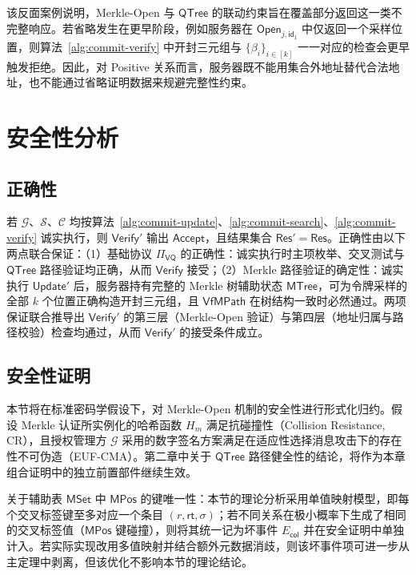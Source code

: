 该反面案例说明，Merkle-Open 与 $\mathsf{QTree}$ 的联动约束旨在覆盖部分返回这一类不完整响应。若省略发生在更早阶段，例如服务器在 $\mathsf{Open}_{j,\mathsf{id}_1}$ 中仅返回一个采样位置，则算法~\ref{alg:commit-verify} 中开封三元组与 $\{\beta_i\}_{i\in[k]}$ 一一对应的检查会更早触发拒绝。因此，对 Positive 关系而言，服务器既不能用集合外地址替代合法地址，也不能通过省略证明数据来规避完整性约束。

\section{安全性分析}\label{sec:commit-security}

\subsection{正确性}\label{sec:commit-correctness}

若 $\mathcal{G}$、$\mathcal{S}$、$\mathcal{C}$ 均按算法~\ref{alg:commit-update}、\ref{alg:commit-search}、\ref{alg:commit-verify} 诚实执行，则 $\mathsf{Verify}'$ 输出 $\mathsf{Accept}$，且结果集合 $\mathsf{Res}'=\mathsf{Res}$。正确性由以下两点联合保证：（1）基础协议 $\Pi_{\mathsf{VQ}}$ 的正确性：诚实执行时主项枚举、交叉测试与 $\mathsf{QTree}$ 路径验证均正确，从而 $\mathsf{Verify}$ 接受；（2）Merkle 路径验证的确定性：诚实执行 $\mathsf{Update}'$ 后，服务器持有完整的 Merkle 树辅助状态 $\mathsf{MTree}$，可为令牌采样的全部 $k$ 个位置正确构造开封三元组，且 $\mathsf{VfMPath}$ 在树结构一致时必然通过。两项保证联合推导出 $\mathsf{Verify}'$ 的第三层（Merkle-Open 验证）与第四层（地址归属与路径校验）检查均通过，从而 $\mathsf{Verify}'$ 的接受条件成立。

\subsection{安全性证明}\label{sec:commit-security-ab}
本节将在标准密码学假设下，对 Merkle-Open 机制的安全性进行形式化归约。假设 Merkle 认证所实例化的哈希函数 $H_m$ 满足抗碰撞性（Collision Resistance, CR），且授权管理方 $\mathcal{G}$ 采用的数字签名方案满足在适应性选择消息攻击下的存在性不可伪造（EUF-CMA）。第二章中关于 $\mathsf{QTree}$ 路径健全性的结论，将作为本章组合证明中的独立前置部件继续生效。

关于辅助表 $\mathsf{MSet}$ 中 $\mathsf{MPos}$ 的键唯一性：本节的理论分析采用单值映射模型，即每个交叉标签键至多对应一个条目 $(r,\mathsf{rt},\sigma)$；若不同关系在极小概率下生成了相同的交叉标签值（$\mathsf{MPos}$ 键碰撞），则将其统一记为坏事件 $E_{\mathsf{col}}$ 并在安全证明中单独计入。若实际实现改用多值映射并结合额外元数据消歧，则该坏事件项可进一步从主定理中剥离，但该优化不影响本节的理论结论。

